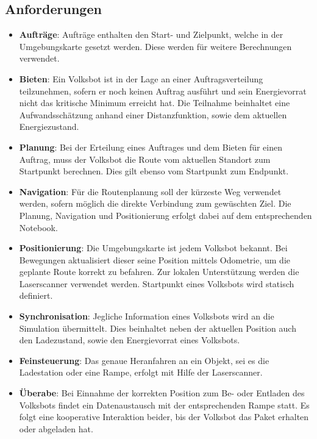\subsection{Anforderungen}

\begin{itemize}

\item \textbf{Aufträge}: Aufträge enthalten den Start- und Zielpunkt, welche in der Umgebungskarte gesetzt werden. Diese werden für weitere Berechnungen verwendet.

\item \textbf{Bieten}: Ein Volksbot ist in der Lage an einer Auftragsverteilung teilzunehmen, sofern er noch keinen Auftrag ausführt und sein Energievorrat nicht das kritische Minimum erreicht hat. Die Teilnahme beinhaltet eine Aufwandsschätzung anhand einer Distanzfunktion, sowie dem aktuellen Energiezustand. 

\item \textbf{Planung}: Bei der Erteilung eines Auftrages und dem Bieten für einen Auftrag, muss der Volksbot die Route vom aktuellen Standort zum Startpunkt berechnen. Dies gilt ebenso vom Startpunkt zum Endpunkt.

\item \textbf{Navigation}: Für die Routenplanung soll der kürzeste Weg verwendet werden, sofern möglich die direkte Verbindung zum gewüschten Ziel. Die Planung, Navigation und Positionierung erfolgt dabei auf dem entsprechenden Notebook.

\item \textbf{Positionierung}: Die Umgebungskarte ist jedem Volksbot bekannt. Bei Bewegungen aktualisiert dieser seine Position mittels Odometrie, um die geplante Route korrekt zu befahren. Zur lokalen Unterstützung werden die Laserscanner verwendet werden. Startpunkt eines Volksbots wird statisch definiert.

\item \textbf{Synchronisation}: Jegliche Information eines Volksbots wird an die Simulation übermittelt. Dies beinhaltet neben der aktuellen Position auch den Ladezustand, sowie den Energievorrat eines Volksbots.

\item \textbf{Feinsteuerung}: Das genaue Heranfahren an ein Objekt, sei es die Ladestation oder eine Rampe, erfolgt mit Hilfe der Laserscanner. 

\item \textbf{Überabe}: Bei Einnahme der korrekten Position zum Be- oder Entladen des Volksbots findet ein Datenaustausch mit der entsprechenden Rampe statt. Es folgt eine kooperative Interaktion beider, bis der Volksbot das Paket erhalten oder abgeladen hat.


\end{itemize}
